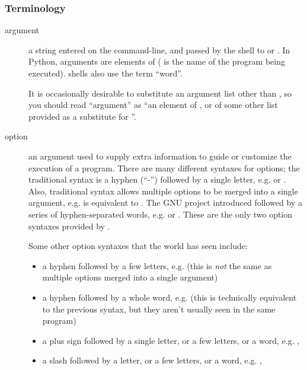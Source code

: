 \subsubsection{Terminology\label{optparse-terminology}}
\begin{description}
\item[argument]
a string entered on the command-line, and passed by the shell to
 or .  In Python, arguments are elements of
 ( is the name of the program being
executed).  \UNIX{} shells also use the term ``word''.

It is occasionally desirable to substitute an argument list other
than , so you should read ``argument'' as ``an element of
, or of some other list provided as a substitute for
''.
\item[option   ]
an argument used to supply extra information to guide or customize the
execution of a program.  There are many different syntaxes for
options; the traditional \UNIX{} syntax is a hyphen (``-'') followed by a
single letter, e.g.  or .  Also, traditional \UNIX{}
syntax allows multiple options to be merged into a single argument,
e.g.   is equivalent to .  The GNU project
introduced  followed by a series of hyphen-separated words,
e.g.  or .  These are the only two option
syntaxes provided by .

Some other option syntaxes that the world has seen include:
\begin{itemize}
\item {} 
a hyphen followed by a few letters, e.g.  (this is
\emph{not} the same as multiple options merged into a single argument)

\item {} 
a hyphen followed by a whole word, e.g.  (this is
technically equivalent to the previous syntax, but they aren't
usually seen in the same program)

\item {} 
a plus sign followed by a single letter, or a few letters,
or a word, e.g. , 

\item {} 
a slash followed by a letter, or a few letters, or a word, e.g.
, 

\end{itemize}


\end{description}
